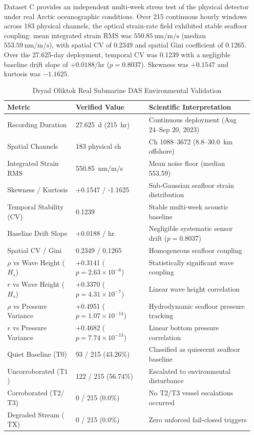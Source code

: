 \documentclass[conference]{IEEEtran}
\newcommand{\dstate}[1]{\ensuremath{\mathrm{#1}}}
\begin{document}
Dataset C provides an independent multi-week stress test of the physical
detector under real Arctic oceanographic conditions. Over 215 continuous hourly
windows across 183 physical channels, the optical strain-rate field exhibited
stable seafloor coupling: mean integrated strain RMS was $550.85~\mathrm{nm/m/s}$
(median $553.59~\mathrm{nm/m/s}$), with spatial CV of 0.2349 and spatial Gini
coefficient of 0.1265. Over the 27.625-day deployment, temporal CV was 0.1239
with a negligible baseline drift slope of $+0.0188/\mathrm{hr}$ ($p = 0.8037$).
Skewness was $+0.1547$ and kurtosis was $-1.1625$.

\begin{table}[!t]
\caption{Dryad Oliktok Real Submarine DAS Environmental Validation}
\label{tab:oliktok}
\centering
\footnotesize
\begin{tabular}{@{}p{}p{}p{}@{}}
\toprule
Metric & Verified Value & Scientific Interpretation \\
\midrule
Recording Duration & 27.625~d (215~hr) & Continuous deployment (Aug 24--Sep 20, 2023) \\
Spatial Channels & 183 physical ch & Ch 1088--3672 (8.8--30.0~km offshore) \\
Integrated Strain RMS & 550.85~nm/m/s & Mean noise floor (median 553.59) \\
Skewness / Kurtosis & +0.1547 / -1.1625 & Sub-Gaussian seafloor strain distribution \\
Temporal Stability (CV) & 0.1239 & Stable multi-week acoustic baseline \\
Baseline Drift Slope & +0.0188 / hr & Negligible systematic sensor drift ($p=0.8037$) \\
Spatial CV / Gini & 0.2349 / 0.1265 & Homogeneous seafloor coupling \\
$\rho$ vs Wave Height ($H_s$) & +0.3141 ($p=2.63\times10^{-6}$) & Statistically significant wave coupling \\
$r$ vs Wave Height ($H_s$) & +0.3370 ($p=4.31\times10^{-7}$) & Linear wave height correlation \\
$\rho$ vs Pressure Variance & +0.4951 ($p=1.07\times10^{-14}$) & Hydrodynamic seafloor pressure tracking \\
$r$ vs Pressure Variance & +0.4682 ($p=7.74\times10^{-13}$) & Linear bottom pressure correlation \\
Quiet Baseline (\dstate{T0}) & 93 / 215 (43.26\%) & Classified as quiescent seafloor baseline \\
Uncorroborated (\dstate{T1}) & 122 / 215 (56.74\%) & Escalated to environmental disturbance \\
Corroborated (\dstate{T2}/\dstate{T3}) & 0 / 215 (0.0\%) & No T2/T3 vessel escalations occurred \\
Degraded Stream (\dstate{TX}) & 0 / 215 (0.0\%) & Zero unforced fail-closed triggers \\
\bottomrule
\end{tabular}
\end{table}
\end{document}
